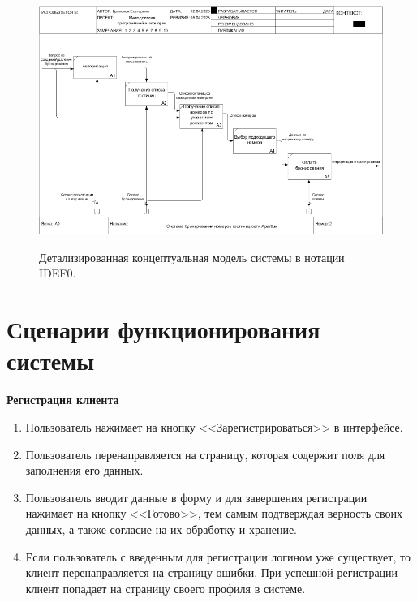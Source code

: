 \begin{figure}[h!]
	\begin{center}
		{\includegraphics[scale = 0.79, angle=90]{img/idef0/02_A0.png}}
		\caption{Детализированная концептуальная модель системы в нотации IDEF0.}
		\label{fig:idef0-2}
	\end{center}
\end{figure}

\pagebreak

\section*{Сценарии функционирования системы}
\textbf{Регистрация клиента}
\begin{enumerate}
	\item Пользователь нажимает на кнопку <<Зарегистрироваться>> в интерфейсе.
	
	\item Пользователь перенаправляется на страницу, которая содержит поля для заполнения его данных.
	
	\item Пользователь вводит данные в форму и для завершения регистрации нажимает на кнопку <<Готово>>, тем самым подтверждая верность своих данных, а также согласие на их обработку и хранение.
	
	\item Если пользователь с введенным для регистрации логином уже существует, то клиент перенаправляется на страницу ошибки. При успешной регистрации клиент попадает на страницу своего профиля в системе. \\
\end{enumerate}

